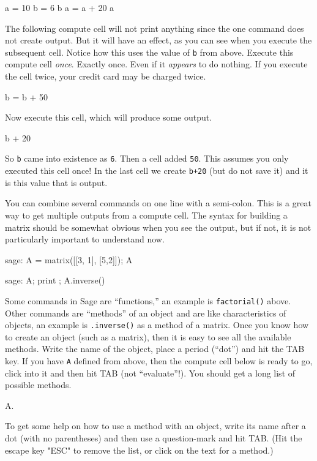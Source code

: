\begin{sageverbatim}
a = 10
b = 6
b
a = a + 20
a
\end{sageverbatim}
%
The following compute cell will not print anything since the one command does not create output.  But it will have an effect, as you can see when you execute the subsequent cell.  Notice how this uses the value of \verb?b? from above.  Execute this compute cell \emph{once}.  Exactly once.  Even if it \emph{appears} to do nothing.  If you execute the cell twice, your credit card may be charged twice.
%
\begin{sageverbatim}
b = b + 50
\end{sageverbatim}
%
Now execute this cell, which will produce some output.
%
\begin{sageverbatim}
b + 20
\end{sageverbatim}
%
So \verb?b? came into existence as \verb?6?.  Then a cell added \verb?50?.  This assumes you only executed this cell once!  In the last cell we create \verb?b+20? (but do not save it) and it is this value that is output.\par
%
You can combine several commands on one line with a semi-colon.  This is a great way to get multiple outputs from a compute cell.  The syntax for building a matrix should be somewhat obvious when you see the output, but if not, it is not particularly important to understand now.
%
\begin{sageverbatim}
sage: A = matrix([[3, 1], [5,2]]); A
\end{sageverbatim}
%
\begin{sageverbatim}
sage: A; print ; A.inverse()
\end{sageverbatim}
%
%
Some commands in Sage are ``functions,'' an example is \verb?factorial()? above.  Other commands are ``methods'' of an object and are like characteristics of objects, an example is \verb?.inverse()? as a method of a matrix.  Once you know how to create an object (such as a matrix), then it is easy to see all the available methods.  Write the name of the object, place a period (``dot'') and hit the TAB key.  If you have \verb?A? defined from above, then the compute cell below is ready to go, click into it and then hit TAB (not ``evaluate''!).  You should get a long list of possible methods.
%
\begin{sageverbatim}
A.
\end{sageverbatim}
%
To get some help on how to use a method with an object, write its name after a dot (with no parentheses) and then use a question-mark and hit TAB.  (Hit the escape key "ESC" to remove the list, or click on the text for a method.)
